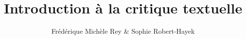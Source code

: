 


\title{Introduction à la critique textuelle}
\author[Frédérique Michèle Rey, Sophie Robert-Hayek]{Frédérique Michèle Rey \& Sophie Robert-Hayek}



\date{}